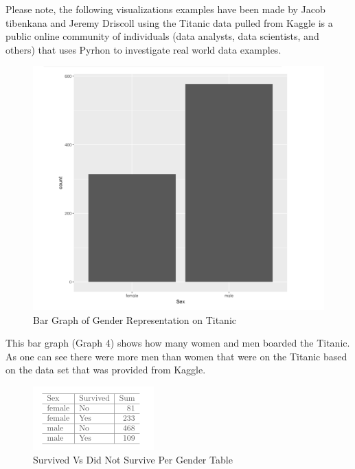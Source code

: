 \documentclass[sigconf]{acmart}
\begin{document}
Please note, the following visualizations examples have been made by Jacob tibenkana and Jeremy Driscoll using the Titanic data pulled from Kaggle is a public online community of individuals (data analysts, data scientists, and others) that uses Pyrhon to investigate real world data examples. 

\begin{figure}[htb]
  \centering
  \includegraphics[width=1.0\columnwidth]{paper2/Graph 4.png}
  \caption{Bar Graph of Gender Representation on Titanic
  \cite{Tibenkana and Driscoll, Data Set from kaggle}}
  \label{fig:Graph 4} 
\end{figure}

This bar graph (Graph 4) shows how many women and men boarded the Titanic. As one can see there were more men than women that were on the Titanic based on the data set that was provided from Kaggle.

\begin{figure}[htb]
  \centering
  \includegraphics[width=1.0\columnwidth]{paper2/Table 2.png}
  \caption{Survived Vs Did Not Survive Per Gender Table
  \cite{Tibenkana and Driscoll, Data Set from Kaggle}}
  \label{fig:Table 2} 
\end{figure}
\end{document}
